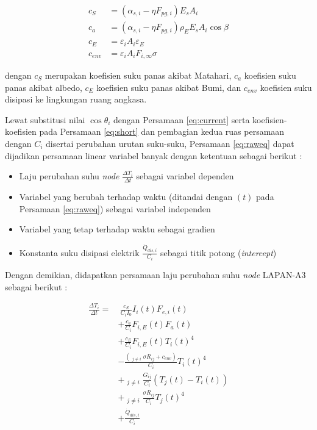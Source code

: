 \begin{equation}
\label{eq:short}
\begin{split}
	c_{S} &= \left(\alpha_{s,i} - \eta F_{pg,i}\right) E_s A_i \\
	c_{a} &= \left(\alpha_{s,i} - \eta F_{pg,i}\right)\rho_{E} E_s A_i \cos{\beta} \\
	c_{E} &= \varepsilon_i A_i \varepsilon_E \\
	c_{env} &= \varepsilon_i A_i F_{i,\infty} \sigma
\end{split}
\end{equation}

dengan $c_{S}$ merupakan koefisien suku panas akibat Matahari, $c_{a}$
koefisien suku panas akibat albedo, $c_{E}$ koefisien suku panas akibat Bumi,
dan $c_{env}$ koefisien suku disipasi ke lingkungan ruang angkasa.

Lewat substitusi nilai $\cos{\theta_i}$ dengan Persamaan \ref{eq:current} serta
koefisien-koefisien pada Persamaan \ref{eq:short} dan pembagian kedua ruas
persamaan dengan $C_i$ disertai perubahan urutan suku-suku,
Persamaan \ref{eq:raweq} dapat dijadikan persamaan linear variabel banyak
dengan ketentuan sebagai berikut :

\begin{itemize}
	\item Laju perubahan suhu \textit{node} $\frac{\Delta T_i}{\Delta t}$ sebagai variabel dependen
	\item Variabel yang berubah terhadap waktu (ditandai dengan $(t)$ pada Persamaan \ref{eq:raweq}) sebagai variabel independen
	\item Variabel yang tetap terhadap waktu sebagai gradien
	\item Konstanta suku disipasi elektrik $\frac{\dot{Q}_{dis,i}}{C_i}$ sebagai titik potong (\textit{intercept})
\end{itemize}

Dengan demikian, didapatkan persamaan laju perubahan suhu \textit{node} LAPAN-A3 sebagai berikut :

\begin{equation}
\label{eq:lineq}
\begin{split}
	\frac{\Delta T_i}{\Delta t} = &\ \frac{c_S}{C_i I_0} I_{i}(t) F_{e,i}(t) \\
	&+ \frac{c_a}{C_i} F_{i,E}(t) F_a(t) \\
	&+ \frac{c_E}{C_i} F_{i,E}(t) T_{i}(t)^4 \\
	&- \frac{\left( \mathop{\sum_{j=1}^{N}}_{j \neq i} \sigma R_{ij} + c_{env} \right) }{C_i} T_{i}(t)^4 \\
	&+ \mathop{\sum_{j=1}^{N}}_{j \neq i} \frac{G_{ij}}{C_i} \left(T_j(t) - T_i(t)\right) \\
	&+ \mathop{\sum_{j=1}^{N}}_{j \neq i} \frac{\sigma R_{ij}}{C_i}T_{j}(t)^4 \\
	&+ \frac{\dot{Q}_{dis,i}}{C_i}
\end{split}
\end{equation}

